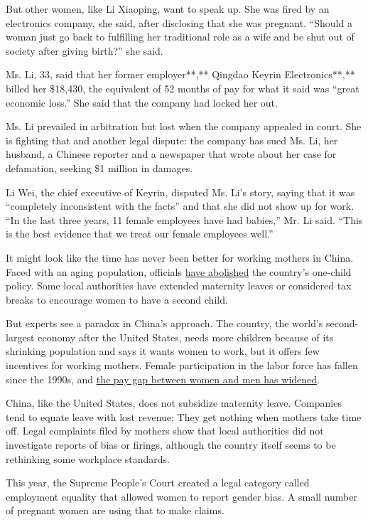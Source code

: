 But other women, like Li Xiaoping, want to speak up. She was fired by an
electronics company, she said, after disclosing that she was pregnant.
``Should a woman just go back to fulfilling her traditional role as a
wife and be shut out of society after giving birth?'' she said.

Ms. Li, 33, said that her former employer**,** Qingdao Keyrin
Electronics**,** billed her \$18,430, the equivalent of 52 months of pay
for what it said was ``great economic loss.'' She said that the company
had locked her out.

Ms. Li prevailed in arbitration but lost when the company appealed in
court. She is fighting that and another legal dispute: the company has
sued Ms. Li, her husband, a Chinese reporter and a newspaper that wrote
about her case for defamation, seeking \$1 million in damages.

Li Wei, the chief executive of Keyrin, disputed Ms. Li's story, saying
that it was ``completely inconsistent with the facts'' and that she did
not show up for work. ``In the last three years, 11 female employees
have had babies,'' Mr. Li said. ``This is the best evidence that we
treat our female employees well.''

It might look like the time has never been better for working mothers in
China. Faced with an aging population, officials
\href{https://www.nytimes.com/2015/11/14/world/asia/china-one-child-policy-loneliest-generation.html}{have
abolished} the country's one-child policy. Some local authorities have
extended maternity leaves or considered tax breaks to encourage women to
have a second child.

But experts see a paradox in China's approach. The country, the world's
second-largest economy after the United States, needs more children
because of its shrinking population and says it wants women to work, but
it offers few incentives for working mothers. Female participation in
the labor force has fallen since the 1990s, and
\href{http://www3.weforum.org/docs/WEF_GGGR_2018.pdf}{the pay gap
between women and men has widened}.

China, like the United States, does not subsidize maternity leave.
Companies tend to equate leave with lost revenue: They get nothing when
mothers take time off. Legal complaints filed by mothers show that local
authorities did not investigate reports of bias or firings, although the
country itself seems to be rethinking some workplace standards.

This year, the Supreme People's Court created a legal category called
employment equality that allowed women to report gender bias. A small
number of pregnant women are using that to make claims.

